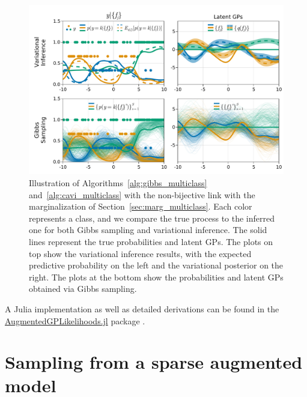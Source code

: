 \begin{figure}
    \centering
    \includegraphics[width=\textwidth]{./chapters/8_discussions/figures/categorical_nonbijective.pdf}
    \caption{Illustration of Algorithms~\ref{alg:gibbs_multiclass} and~\ref{alg:cavi_multiclass} with the non-bijective link with the marginalization of Section~\ref{sec:marg_multiclass}.
    Each color represents a class, and we compare the true process to the inferred one for both Gibbs sampling and variational inference.
    The solid lines represent the true probabilities and latent \ac{GPs}.
    The plots on top show the variational inference results, with the expected predictive probability on the left and the variational posterior on the right.
    The plots at the bottom show the probabilities and latent GPs obtained via Gibbs sampling.}
    \label{fig:multiclass}
\end{figure}

A Julia implementation as well as detailed derivations can be found in the \href{https://github.com/JuliaGaussianProcesses/AugmentedGPLikelihoods.jl}{AugmentedGPLikelihoods.jl} package \cite{theo_galy_fajou_2022_6347022}.

\section{Sampling from a sparse augmented model}

